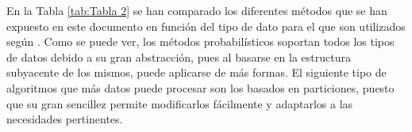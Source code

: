 \documentclass[10pt, a4paper]{article}
\begin{document}
En la Tabla \ref{tab:Tabla 2} se han comparado los diferentes métodos que se han expuesto en este documento en función del tipo de dato para el que son utilizados según \cite{articulo14,otrolibro}. Como se puede ver, los métodos probabilísticos soportan todos los tipos de datos debido a su gran abstracción, pues al basarse en la estructura subyacente de los mismos, puede aplicarse de más formas. El siguiente tipo de algoritmos que más datos puede procesar son los basados en particiones, puesto que su gran sencillez permite modificarlos fácilmente y adaptarlos a las necesidades pertinentes.

\begin{table}[ht]
\renewcommand\arraystretch{2}
\centering
{}
\caption{Comparativa entre los métodos de clusterización y los tipos de datos con los que suelen trabajar.}
\label{tab:Tabla 2}
\end{table}
\end{document}
